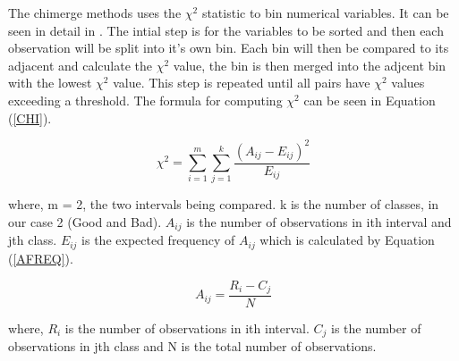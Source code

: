 The chimerge methods uses the $\chi^2$ statistic to bin numerical variables. It can be seen in detail in \cite{kerber1992chimerge}. The intial step is for the variables to be sorted and then each observation will be split into it's own bin. Each bin will then be compared to its adjacent and calculate the $\chi^2$ value, the bin is then merged into the adjcent bin with the lowest $\chi^2$ value. This step is repeated until all pairs have $\chi^2$ values exceeding a threshold. The formula for computing $\chi^2$ can be seen in Equation (\ref{CHI}).

\begin{equation}\label{CHI}
\chi^2 = \sum^{m}_{i=1}\sum^{k}_{j=1} \dfrac{(A_{ij} - E_{ij})^2}{ E_{ij}}
\end{equation}

where, m = 2, the two intervals being compared. k is the number of classes, in our case 2 (Good and Bad). $A_{ij}$ is the number of observations in ith interval and jth class. $E_{ij}$ is the expected frequency of $A_{ij}$ which is calculated by Equation (\ref{AFREQ}).

\begin{equation}\label{AFREQ}
A_{ij} = \dfrac{R_i - C_j}{N}
\end{equation}

where, $R_i$ is the number of observations in ith interval. $C_j$ is the number of observations in jth class and N is the total number of observations.

